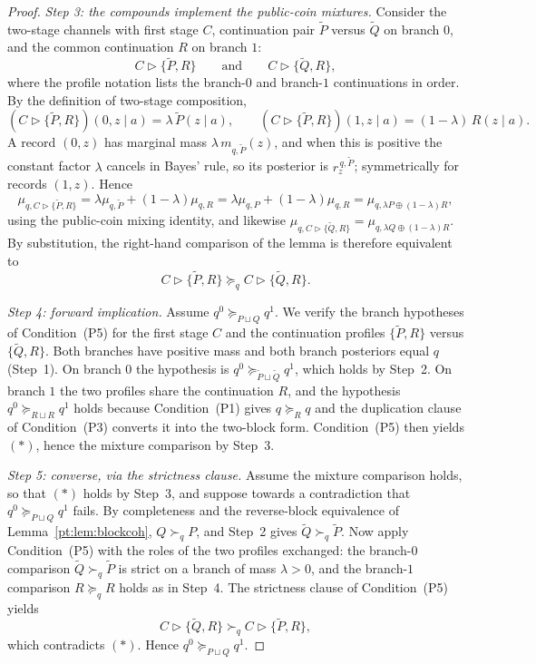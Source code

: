 \documentclass[11pt,a4paper]{article}
\theoremstyle{definition}
\newcommand{\1}{\mathbf 1}
\begin{document}
\begin{proof}
\emph{Step 3: the compounds implement the public-coin mixtures.}
Consider the two-stage channels with first stage $C$, continuation pair $\widetilde P$ versus $\widetilde Q$ on branch
$0$, and the common continuation $R$ on branch $1$:
\[
C\triangleright\{\widetilde P,R\}
\qquad\text{and}\qquad
C\triangleright\{\widetilde Q,R\},
\]
where the profile notation lists the branch-$0$ and branch-$1$ continuations in order.  By the definition of two-stage
composition,
\[
(C\triangleright\{\widetilde P,R\})(0,z\mid a)=\lambda\,\widetilde P(z\mid a),
\qquad
(C\triangleright\{\widetilde P,R\})(1,z\mid a)=(1-\lambda)\,R(z\mid a).
\]
A record $(0,z)$ has marginal mass $\lambda\,m_{q,\widetilde P}(z)$, and when this is positive the constant factor
$\lambda$ cancels in Bayes' rule, so its posterior is $r_z^{\,q,\widetilde P}$; symmetrically for records $(1,z)$.
Hence
\[
\mu_{q,C\triangleright\{\widetilde P,R\}}
=
\lambda\mu_{q,\widetilde P}+(1-\lambda)\mu_{q,R}
=
\lambda\mu_{q,P}+(1-\lambda)\mu_{q,R}
=
\mu_{q,\lambda P\oplus(1-\lambda)R},
\]
using the public-coin mixing identity, and likewise
$\mu_{q,C\triangleright\{\widetilde Q,R\}}=\mu_{q,\lambda Q\oplus(1-\lambda)R}$.  By substitution, the right-hand
comparison of the lemma is therefore equivalent to
\[
C\triangleright\{\widetilde P,R\}
\succeq_q
C\triangleright\{\widetilde Q,R\}.
\tag{$\ast$}
\]

\emph{Step 4: forward implication.}
Assume $q^0\succeq_{P\sqcup Q}q^1$.  We verify the branch hypotheses of Condition~\textup{(P5)} for the first stage $C$ and
the continuation profiles $\{\widetilde P,R\}$ versus $\{\widetilde Q,R\}$.  Both branches have positive mass and both
branch posteriors equal $q$ (Step~1).  On branch $0$ the hypothesis is
$q^0\succeq_{\widetilde P\sqcup\widetilde Q}q^1$, which holds by Step~2.  On branch $1$ the two profiles share the
continuation $R$, and the hypothesis $q^0\succeq_{R\sqcup R}q^1$ holds because Condition~\textup{(P1)} gives
$q\succeq_R q$ and the duplication clause of Condition~\textup{(P3)} converts it into the two-block form.
Condition~\textup{(P5)} then yields $(\ast)$, hence the mixture comparison by Step~3.

\emph{Step 5: converse, via the strictness clause.}
Assume the mixture comparison holds, so that $(\ast)$ holds by Step~3, and suppose towards a contradiction that
$q^0\succeq_{P\sqcup Q}q^1$ fails.  By completeness and the reverse-block equivalence of Lemma~\ref{pt:lem:blockcoh},
$Q\succ_q P$, and Step~2 gives $\widetilde Q\succ_q\widetilde P$.  Now apply Condition~\textup{(P5)} with the roles of the
two profiles exchanged: the branch-$0$ comparison $\widetilde Q\succ_q\widetilde P$ is strict on a branch of mass
$\lambda>0$, and the branch-$1$ comparison $R\succeq_q R$ holds as in Step~4.  The strictness clause of
Condition~\textup{(P5)} yields
\[
C\triangleright\{\widetilde Q,R\}
\succ_q
C\triangleright\{\widetilde P,R\},
\]
which contradicts $(\ast)$.  Hence $q^0\succeq_{P\sqcup Q}q^1$.
\end{proof}
\end{document}
